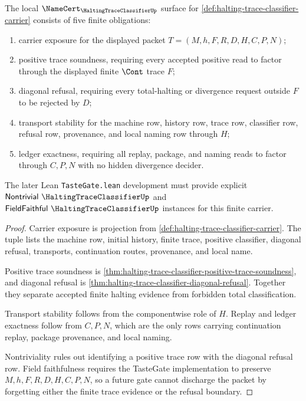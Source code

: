 \begin{theorem}
\label{thm:halting-trace-classifier-namecert-obligations}
The local $\NameCert_{\HaltingTraceClassifierUp}$ surface for \autoref{def:halting-trace-classifier-carrier} consists of five finite obligations:
\begin{enumerate}
\item carrier exposure for the displayed packet $T=(M,h,F,R,D,H,C,P,N)$;
\item positive trace soundness, requiring every accepted positive read to factor through the displayed finite $\Cont$ trace $F$;
\item diagonal refusal, requiring every total-halting or divergence request outside $F$ to be rejected by $D$;
\item transport stability for the machine row, history row, trace row, classifier row, refusal row, provenance, and local naming row through $H$;
\item ledger exactness, requiring all replay, package, and naming reads to factor through $C,P,N$ with no hidden divergence decider.
\end{enumerate}
The later Lean \texttt{TasteGate.lean} development must provide explicit $\mathsf{Nontrivial}\ \HaltingTraceClassifierUp$ and $\mathsf{FieldFaithful}\ \HaltingTraceClassifierUp$ instances for this finite carrier.
\end{theorem}
\begin{proof}
Carrier exposure is projection from \autoref{def:halting-trace-classifier-carrier}. The tuple lists the machine row, initial history, finite trace, positive classifier, diagonal refusal, transports, continuation routes, provenance, and local name.

Positive trace soundness is \autoref{thm:halting-trace-classifier-positive-trace-soundness}, and diagonal refusal is \autoref{thm:halting-trace-classifier-diagonal-refusal}. Together they separate accepted finite halting evidence from forbidden total classification.

Transport stability follows from the componentwise role of $H$. Replay and ledger exactness follow from $C,P,N$, which are the only rows carrying continuation replay, package provenance, and local naming.

Nontriviality rules out identifying a positive trace row with the diagonal refusal row. Field faithfulness requires the TasteGate implementation to preserve $M,h,F,R,D,H,C,P,N$, so a future gate cannot discharge the packet by forgetting either the finite trace evidence or the refusal boundary.
\end{proof}

